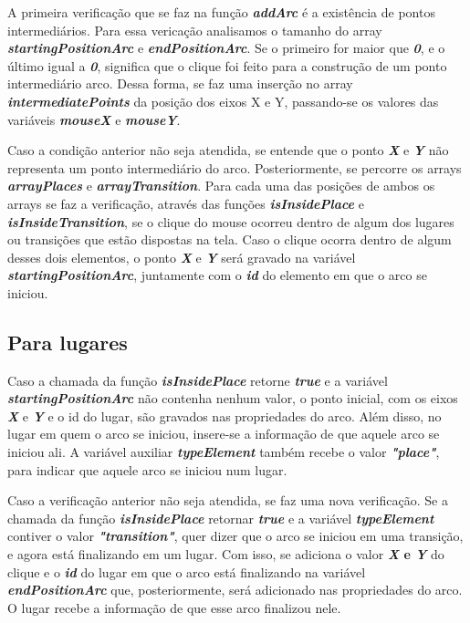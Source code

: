 \documentclass[
	12pt,				%
	openright,			%
	oneside,			%
	a4paper,			%
	english,			%
	brazil				%
	]{abntex2}
\begin{document}
A primeira verificação que se faz na função \textbf{\textit{addArc}} é a existência de pontos intermediários. Para essa vericação analisamos o tamanho do array \textbf{\textit{startingPositionArc}} e \textbf{\textit{endPositionArc}}. Se o primeiro for maior que \textbf{\textit{0}}, e o último igual a \textit{\textbf{0}}, significa que o clique foi feito para a construção de um ponto intermediário  arco. Dessa forma, se faz uma inserção no array \textbf{\textit{intermediatePoints}} da posição dos eixos X e Y, passando-se os valores das variáveis \textbf{\textit{mouseX}} e \textbf{\textit{mouseY}}.



Caso a condição anterior não seja atendida, se entende que o ponto \textbf{\textit{X}} e \textbf{\textit{Y}} não representa um ponto intermediário do arco. Posteriormente, se percorre os arrays \textbf{\textit{arrayPlaces}} e \textbf{\textit{arrayTransition}}. Para cada uma das posições de ambos os arrays se faz a verificação, através das funções \textbf{\textit{isInsidePlace}} e \textbf{\textit{isInsideTransition}}, se o clique do mouse ocorreu dentro de algum dos lugares ou transições que estão dispostas na tela. Caso o clique ocorra dentro de algum desses dois elementos, o ponto \textbf{\textit{X}} e \textbf{\textit{Y}} será gravado na variável \textbf{\textit{startingPositionArc}}, juntamente com o \textbf{\textit{id}} do elemento em que o arco se iniciou. 

\subsection*{Para lugares}

Caso a chamada da função \textbf{\textit{isInsidePlace}} retorne \textbf{\textit{true}} e a variável \textbf{\textit{startingPositionArc}} não contenha nenhum valor, o ponto inicial, com os eixos \textbf{\textit{X}} e \textbf{\textit{Y}} e o id do lugar, são gravados nas propriedades do arco. Além disso, no lugar em quem o arco se iniciou, insere-se a informação de que aquele arco se iniciou ali. A variável auxiliar \textbf{\textit{typeElement}} também recebe o valor \textbf{\textit{"place"}}, para indicar que aquele arco se iniciou num lugar. 

Caso a verificação anterior não seja atendida, se faz uma nova verificação. Se a chamada da função \textbf{\textit{isInsidePlace}} retornar \textbf{\textit{true}} e a variável \textbf{\textit{typeElement}} contiver o valor \textbf{\textit{"transition"}}, quer dizer que o arco se iniciou em uma transição, e agora está finalizando em um lugar. Com isso, se adiciona o valor \textbf{\textit{X} e \textbf{\textit{Y}}} do clique e o \textbf{\textit{id}} do lugar em que o arco está finalizando na variável \textbf{\textit{endPositionArc}} que, posteriormente, será adicionado nas propriedades do arco. O lugar recebe a informação de que esse arco finalizou nele.
\end{document}
